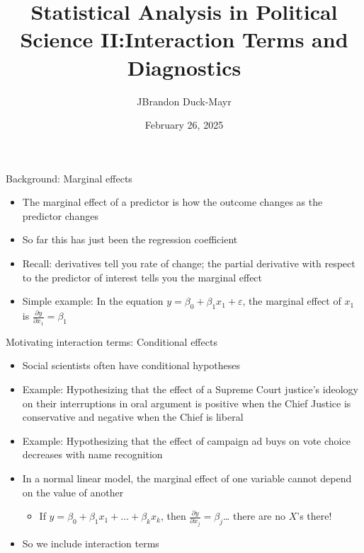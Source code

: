 \documentclass[
  ignorenonframetext,
]{beamer}
\title{Statistical Analysis in Political Science II:\newline Interaction Terms and Diagnostics}
\author{JBrandon Duck-Mayr}
\date{February 26, 2025}
\providecommand{\tightlist}{%
  \setlength{\itemsep}{0pt}\setlength{\parskip}{0pt}}
\newcommand{\setsep}{\setlength{\itemsep}{3pt}}
\newcommand{\setskip}{\setlength{\parskip}{3pt}}
\renewcommand{\tightlist}{\setsep\setskip}
\begin{document}
\frame{\titlepage}

\begin{frame}{Background: Marginal effects}
\label{background-marginal-effects}
\pause

\begin{itemize}[<+->]
\tightlist
\item
  The marginal effect of a predictor is how the outcome changes as the predictor changes
\item
  So far this has just been the regression coefficient
\item
  Recall: derivatives tell you rate of change; the partial derivative with respect to the predictor of interest tells you the marginal effect
\item
  Simple example: In the equation \(y = \beta_0 + \beta_1 x_1 + \varepsilon\), the marginal effect of \(x_1\) is \(\ensuremath{\frac{\partial{y}}{\partial{x_1}}} = \beta_1\)
\end{itemize}
\end{frame}

\begin{frame}{Motivating interaction terms: Conditional effects}
\label{motivating-interaction-terms-conditional-effects}
\pause

\begin{itemize}[<+->]
\tightlist
\item
  Social scientists often have conditional hypotheses
\item
  Example: Hypothesizing that the effect of a Supreme Court justice's ideology on their interruptions in oral argument is positive when the Chief Justice is conservative and negative when the Chief is liberal
\item
  Example: Hypothesizing that the effect of campaign ad buys on vote choice decreases with name recognition
\item
  In a normal linear model, the marginal effect of one variable cannot depend on the value of another

  \begin{itemize}[<+->]
  \tightlist
  \item
    If \(y = \beta_0 + \beta_1 x_1 + \dots + \beta_k x_k\), then \(\ensuremath{\frac{\partial{y}}{\partial{x_j}}} = \beta_j\)\ldots{} there are no \(X\)'s there!
  \end{itemize}
\item
  So we include interaction terms
\end{itemize}
\end{frame}
\end{document}
